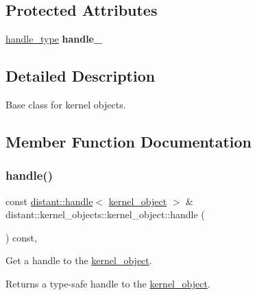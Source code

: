 \subsection*{Protected Attributes}
\begin{DoxyCompactItemize}
\item 
\mbox{\label{classdistant_1_1kernel__objects_1_1kernel__object_ad1107811388709bb8c59eebc64101b31}} 
\mbox{\hyperlink{classdistant_1_1handle}{handle\+\_\+type}} {\bfseries handle\+\_\+}
\end{DoxyCompactItemize}


\subsection{Detailed Description}
Base class for kernel objects. 

\subsection{Member Function Documentation}
\mbox{\label{classdistant_1_1kernel__objects_1_1kernel__object_ad987412d770537d60500a007d7bc3d9e}} 
\subsubsection{\texorpdfstring{handle()}{handle()}}
{\footnotesize\ttfamily const \mbox{\hyperlink{classdistant_1_1handle}{distant\+::handle}}$<$ \mbox{\hyperlink{classdistant_1_1kernel__objects_1_1kernel__object}{kernel\+\_\+object}} $>$ \& distant\+::kernel\+\_\+objects\+::kernel\+\_\+object\+::handle (\begin{DoxyParamCaption}{ }\end{DoxyParamCaption}) const\hspace{0.3cm}{\ttfamily [inline]}, {\ttfamily [noexcept]}}



Get a handle to the \mbox{\hyperlink{classdistant_1_1kernel__objects_1_1kernel__object}{kernel\+\_\+object}}. 

\begin{DoxyReturn}{Returns}
a type-\/safe handle to the \mbox{\hyperlink{classdistant_1_1kernel__objects_1_1kernel__object}{kernel\+\_\+object}}. 
\end{DoxyReturn}
\mbox{\label{classdistant_1_1kernel__objects_1_1kernel__object_a07c26f8b2f2121367d9a71c64d3bf2c4}} 
